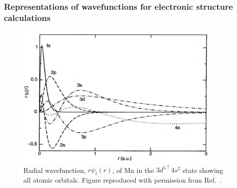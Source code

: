 \documentclass[11pt, twoside]{report}
\begin{document}
\subsubsection{Representations of wavefunctions for electronic structure calculations}
\begin{figure}[h!]
  \centering
    \includegraphics[width=0.9\textwidth]{figures/atomic_radial_wavefunction.png}
    \caption[Radial wavefunction, $r\psi_l(r)$, of Mn in the $3d^{5\uparrow}4s^2$ state showing all atomic orbitals.]{Radial wavefunction, $r\psi_l(r)$, of Mn in the $3d^{5\uparrow}4s^2$ state showing all atomic orbitals. Figure reproduced with permission from Ref.~.}
  \label{atomic_radial_wavefunction}
\end{figure}

\end{document}
